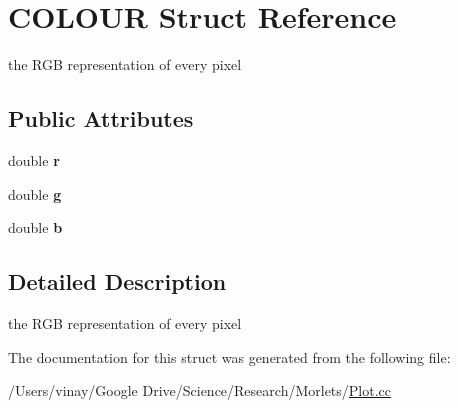 \hypertarget{struct_c_o_l_o_u_r}{}\section{C\+O\+L\+O\+U\+R Struct Reference}
\label{struct_c_o_l_o_u_r}


the R\+G\+B representation of every pixel  


\subsection*{Public Attributes}
\begin{DoxyCompactItemize}
\item 
\hypertarget{struct_c_o_l_o_u_r_a36bcdaa21c239b52ea145b00f6c02fef}{}double {\bfseries r}\label{struct_c_o_l_o_u_r_a36bcdaa21c239b52ea145b00f6c02fef}

\item 
\hypertarget{struct_c_o_l_o_u_r_a7f555cfaee6a22851493dabb733b39aa}{}double {\bfseries g}\label{struct_c_o_l_o_u_r_a7f555cfaee6a22851493dabb733b39aa}

\item 
\hypertarget{struct_c_o_l_o_u_r_aa6afa49758b045d49ca99641097956b3}{}double {\bfseries b}\label{struct_c_o_l_o_u_r_aa6afa49758b045d49ca99641097956b3}

\end{DoxyCompactItemize}


\subsection{Detailed Description}
the R\+G\+B representation of every pixel 

The documentation for this struct was generated from the following file\+:\begin{DoxyCompactItemize}
\item 
/\+Users/vinay/\+Google Drive/\+Science/\+Research/\+Morlets/\hyperlink{_plot_8cc}{Plot.\+cc}\end{DoxyCompactItemize}
